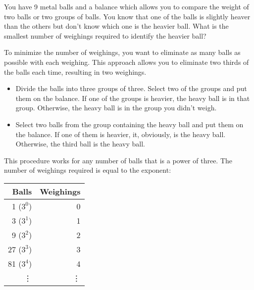 \documentclass[letterpaper, landscape]{exam}
\begin{document}
  \begin{questions}

      \question{}
        You have 9 metal balls and a balance which allows you to compare the weight of two balls or
        two groups of balls.  You know that one of the balls is slightly heaver than the others but
        don't know which one is the heavier ball.  What is the smallest number of weighings required
        to identify the heavier ball?

        \begin{solution}
          To minimize the number of weighings, you want to eliminate as many balls as possible with each
          weighing.  This approach allows you to eliminate two thirds of the balls each time, resulting
          in two weighings.

          \begin{itemize}
            \item 
              Divide the balls into three groups of three.  Select two of the groups and put them on
              the balance.  If one of the groups is heavier, the heavy ball is in that group.
              Otherwise, the heavy ball is in the group you didn't weigh.

            \item 
              Select two balls from the group containing the heavy ball and put them on the balance.
              If one of them is heavier, it, obviously, is the heavy ball.  Otherwise, the third ball
              is the heavy ball. 

          \end{itemize}

          This procedure works for any number of balls that is a power of three. The number of
          weighings required is equal to the exponent:

          \begin{tabular}[H]{rr}
            \toprule
            Balls      & Weighings \\
            \midrule
            1 ($3^0$)  & 0 \\
            3 ($3^1$)  & 1 \\
            9 ($3^2$)  & 2 \\
            27 ($3^3$) & 3 \\
            81 ($3^4$) & 4 \\
            \vdots     & \vdots \\
            \bottomrule
          \end{tabular}


\end{solution}
\end{questions}
\end{document}

